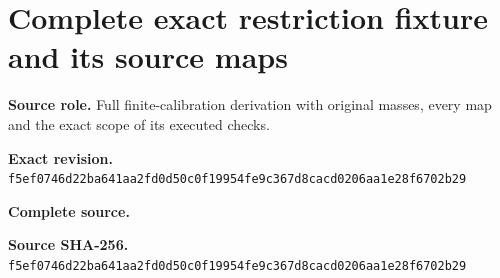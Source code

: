 \begingroup
\sloppy
\small
\clearpage
\section{Complete exact restriction fixture and its source maps}
\noindent\textbf{Source role.} Full finite-calibration derivation with original masses, every map and the exact scope of its executed checks.\par
\noindent\textbf{Exact revision.} \nolinkurl{f5ef0746d22ba641aa2fd0d50c0f19954fe9c367d8cacd0206aa1e28f6702b29}\par
\noindent\textbf{Complete source.} \par
\noindent\textbf{Source SHA-256.} \nolinkurl{f5ef0746d22ba641aa2fd0d50c0f19954fe9c367d8cacd0206aa1e28f6702b29}\par\medskip

\endgroup

